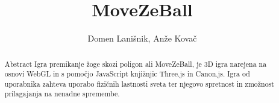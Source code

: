 \documentclass[a4paper]{article}
\begin{document}
\title{MoveZeBall}

\author{Domen Lanišnik, Anže Kovač} %



\maketitle


\begin{abstract}{Abstract}
Igra premikanje žoge skozi poligon ali MoveZeBall, je 3D igra narejena na osnovi WebGL in s pomočjo JavaScript knjižnjic Three.js in Canon.js. Igra od uporabnika zahteva uporabo fizičnih lastnosti sveta ter njegovo spretnost in zmožnost prilagajanja na nenadne spremembe.
\end{abstract}
\end{document}
